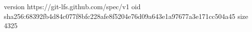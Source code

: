 version https://git-lfs.github.com/spec/v1
oid sha256:68392fb4d84c077f8bfc228afe8f5204e76d09a643e1a97677a3e171cc504a45
size 4325
